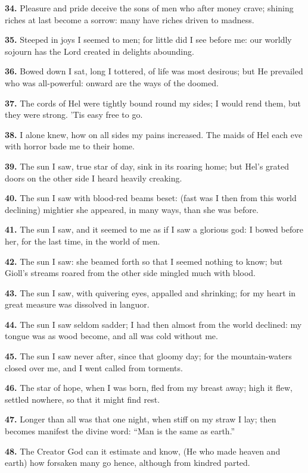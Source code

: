 \textbf{34.} Pleasure and pride deceive the sons of men who after money
crave; shining riches at last become a sorrow: many have riches driven
to madness.

\textbf{35.} Steeped in joys I seemed to men; for little did I see before me:
our worldly sojourn has the Lord created in delights abounding.

\textbf{36.} Bowed down I sat, long I tottered, of life was most desirous;
but He prevailed who was all-powerful: onward are the ways of the
doomed.

\textbf{37.} The cords of Hel were tightly bound round my sides; I would rend
them, but they were strong. 'Tis easy free to go.

\textbf{38.} I alone knew, how on all sides my pains increased. The maids of
Hel each eve with horror bade me to their home.

\textbf{39.} The sun I saw, true star of day, sink in its roaring home; but
Hel's grated doors on the other side I heard heavily creaking.

\textbf{40.} The sun I saw with blood-red beams beset: (fast was I then from
this world declining) mightier she appeared, in many ways, than she
was before.

\textbf{41.} The sun I saw, and it seemed to me as if I saw a glorious god: I
bowed before her, for the last time, in the world of men.

\textbf{42.} The sun I saw: she beamed forth so that I seemed nothing to
know; but Gioll's streams roared from the other side mingled much with
blood.

\textbf{43.} The sun I saw, with quivering eyes, appalled and shrinking; for
my heart in great measure was dissolved in languor.

\textbf{44.} The sun I saw seldom sadder; I had then almost from the world
declined: my tongue was as wood become, and all was cold without me.

\textbf{45.} The sun I saw never after, since that gloomy day; for the
mountain-waters closed over me, and I went called from torments.

\textbf{46.} The star of hope, when I was born, fled from my breast away;
high it flew, settled nowhere, so that it might find rest.

\textbf{47.} Longer than all was that one night, when stiff on my straw I
lay; then becomes manifest the divine word: ``Man is the same as
earth.''

\textbf{48.} The Creator God can it estimate and know, (He who made heaven
and earth) how forsaken many go hence, although from kindred parted.


